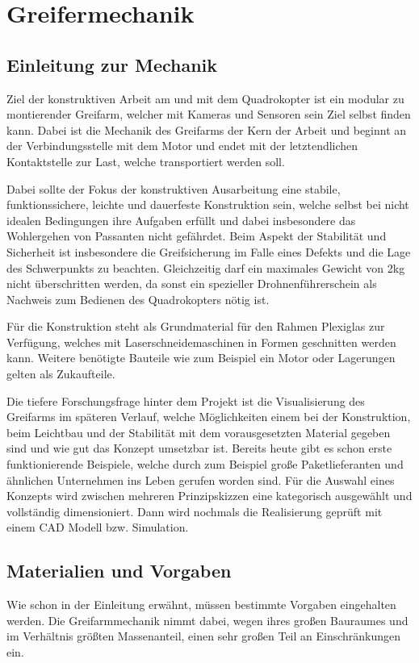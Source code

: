 \chapter{Greifermechanik}
\section{Einleitung zur Mechanik}
Ziel der konstruktiven Arbeit am und mit dem Quadrokopter ist ein modular zu montierender Greifarm, welcher mit Kameras und Sensoren sein Ziel selbst finden kann. Dabei ist die Mechanik des Greifarms der Kern der Arbeit und beginnt an der Verbindungsstelle mit dem Motor und endet mit der letztendlichen Kontaktstelle zur Last, welche transportiert werden soll.
\par
Dabei sollte der Fokus der konstruktiven Ausarbeitung eine stabile, funktionssichere, leichte und dauerfeste Konstruktion sein, welche selbst bei nicht idealen Bedingungen ihre Aufgaben erfüllt und dabei insbesondere das Wohlergehen von Passanten nicht gefährdet. Beim Aspekt der Stabilität und Sicherheit ist insbesondere die Greifsicherung im Falle eines Defekts und die Lage des Schwerpunkts zu beachten. Gleichzeitig darf ein maximales Gewicht von 2kg nicht überschritten werden, da sonst ein spezieller Drohnenführerschein als Nachweis zum Bedienen des Quadrokopters nötig ist.
\par 
Für die Konstruktion steht als Grundmaterial für den Rahmen Plexiglas zur Verfügung, welches mit Laserschneidemaschinen in Formen geschnitten werden kann. Weitere benötigte Bauteile wie zum Beispiel ein Motor oder Lagerungen gelten als Zukaufteile.
\par
Die tiefere Forschungsfrage hinter dem Projekt ist die Visualisierung des Greifarms im späteren Verlauf, welche Möglichkeiten einem bei der Konstruktion, beim Leichtbau und der Stabilität mit dem vorausgesetzten Material gegeben sind und wie gut das Konzept umsetzbar ist. Bereits heute gibt es schon erste funktionierende Beispiele, welche durch zum Beispiel große Paketlieferanten und ähnlichen Unternehmen ins Leben gerufen worden sind.
Für die Auswahl eines Konzepts wird zwischen mehreren Prinzipskizzen eine kategorisch ausgewählt und vollständig dimensioniert. Dann wird nochmals die Realisierung geprüft mit einem CAD Modell bzw. Simulation.

\section{Materialien und Vorgaben}
Wie schon in der Einleitung erwähnt, müssen bestimmte Vorgaben eingehalten werden. Die Greifarmmechanik nimmt dabei, wegen ihres großen Bauraumes und im Verhältnis größten Massenanteil, einen sehr großen Teil an Einschränkungen ein.

